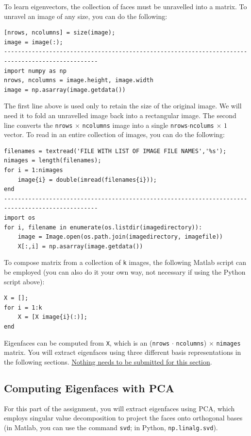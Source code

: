 To learn eigenvectors, the collection of faces must be unravelled into a matrix. To unravel an image of any size, you can do the following:
\begin{lstlisting}
[nrows, ncolumns] = size(image);
image = image(:);
-------------------------------------------------------------------------------------------------
import numpy as np
nrows, ncolumns = image.height, image.width
image = np.asarray(image.getdata())
\end{lstlisting}
The first line above is used only to retain the size of the original image. We will need it to fold an
unravelled image back into a rectangular image. The second line converts the \texttt{nrows} $\times$ \texttt{ncolumns} image into
a single \texttt{nrows}$\cdot$\texttt{ncolums} $\times$ $1$ vector. 
To read in an entire collection of images, you can do the following:
\begin{lstlisting}
filenames = textread('FILE WITH LIST OF IMAGE FILE NAMES','%s');
nimages = length(filenames);
for i = 1:nimages
    image{i} = double(imread(filenames{i}));
end
-------------------------------------------------------------------------------------------------
import os
for i, filename in enumerate(os.listdir(imagedirectory)):
    image = Image.open(os.path.join(imagedirectory, imagefile))
    X[:,i] = np.asarray(image.getdata())
\end{lstlisting}

To compose matrix from a collection of \texttt{k} images, the following Matlab script can be employed (you can also do it your own way, not necessary if using the Python script above):
\begin{lstlisting}
X = [];
for i = 1:k
    X = [X image{i}(:)];
end
\end{lstlisting}

Eigenfaces can be computed from \texttt{X}, which is an (\texttt{nrows} $\cdot$ \texttt{ncolumns}) $\times$ \texttt{nimages} matrix. You will extract eigenfaces using three different basis representations in the following sections. \ul{Nothing needs to be submitted for this section}.

\subsection{Computing Eigenfaces with PCA}

For this part of the assignment, you will extract eigenfaces using PCA, which employs singular value decomposition to project the faces onto orthogonal bases (in Matlab, you can use the command \texttt{svd}; in Python, \texttt{np.linalg.svd}).

